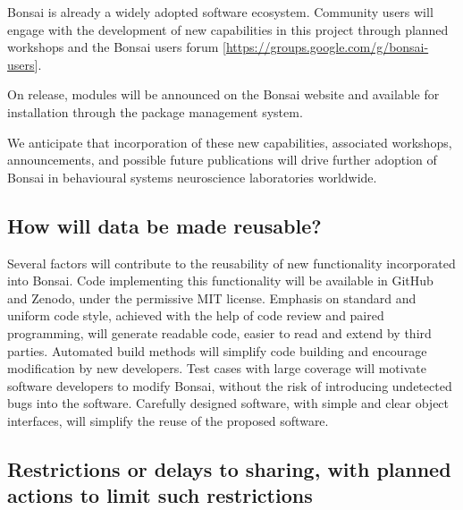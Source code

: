 \documentclass[a4paper,11pt]{article}
\begin{document}
Bonsai is already a widely adopted software ecosystem.  Community users will engage with the development of new capabilities in this project through planned workshops and the Bonsai users forum [\url{https://groups.google.com/g/bonsai-users}]. 

On release, modules will be announced on the Bonsai website and available for installation through the package management system.

We anticipate that incorporation of these new capabilities, associated workshops, announcements, and possible future publications will drive further adoption of Bonsai in behavioural systems neuroscience laboratories worldwide.

\subsection{How will data be made reusable?}


Several factors will contribute to the reusability of new functionality
incorporated into Bonsai. Code implementing this functionality will be
available in GitHub and Zenodo, under the permissive MIT license. Emphasis on standard and
uniform code style, achieved with the help of code review and paired
programming, will generate readable code, easier to read and extend by third
parties. Automated build methods will simplify code building and encourage
modification by new developers. Test cases with large coverage will motivate
software developers to modify Bonsai, without the risk of introducing
undetected bugs into the software. Carefully designed software, with simple and
clear object interfaces, will simplify the reuse of the proposed software.

\subsection{Restrictions or delays to sharing, with planned actions to limit such restrictions} 
\end{document}
